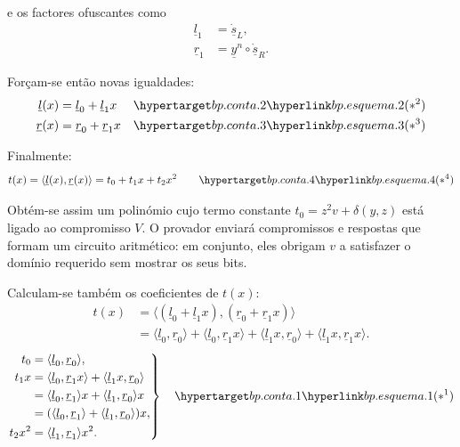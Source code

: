 e os factores ofuscantes como
\begin{align*}
\underline{l}_1 &= \underline{\dot{s}}_L,\\
\underline{r}_1 &= \underline{y}^n \circ \underline{\dot{s}}_R.
\end{align*}

Forçam-se então novas igualdades:
\begin{align*}
\underline{l}(x) &= \underline{l}_0 + \underline{l}_1 x &&\bpconta{2}\\
\underline{r}(x) &= \underline{r}_0 + \underline{r}_1 x &&\bpconta{3}
\end{align*}

Finalmente:
\begin{align*}
t(x) = \langle \underline{l}(x), \underline{r}(x)\rangle = t_0 + t_1 x + t_2 x^2
\qquad\bpconta{4}
\end{align*}

Obtém-se assim um polinómio cujo termo constante
\(t_0=z^2v+\delta(y,z)\) está ligado ao compromisso \(V\). O provador enviará
compromissos e respostas que formam um circuito aritmético: em conjunto, eles
obrigam \(v\) a satisfazer o domínio requerido sem mostrar os seus bits.

Calculam-se também os coeficientes de \(t(x)\):
\begin{align*}
t(x)&=\langle (\underline{l}_0+\underline{l}_1 x),
                 (\underline{r}_0+\underline{r}_1 x)\rangle\\
    &=\langle\underline{l}_0,\underline{r}_0\rangle
     +\langle\underline{l}_0,\underline{r}_1 x\rangle
     +\langle\underline{l}_1 x,\underline{r}_0\rangle
     +\langle\underline{l}_1 x,\underline{r}_1 x\rangle.
\end{align*}
\[
\left.
\begin{aligned}
t_0 &=\langle\underline{l}_0,\underline{r}_0\rangle,\\
t_1x&=\langle\underline{l}_0,\underline{r}_1x\rangle
      +\langle\underline{l}_1x,\underline{r}_0\rangle\\
    &=\langle\underline{l}_0,\underline{r}_1\rangle x
      +\langle\underline{l}_1,\underline{r}_0\rangle x\\
    &=(\langle\underline{l}_0,\underline{r}_1\rangle
      +\langle\underline{l}_1,\underline{r}_0\rangle)x,\\
t_2x^2&=\langle\underline{l}_1,\underline{r}_1\rangle x^2.
\end{aligned}
\right\}\quad\bpconta{1}
\]

